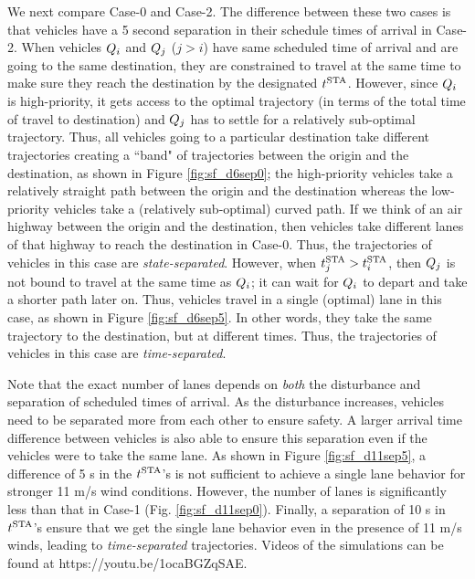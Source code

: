 We next compare Case-0 and Case-2. The difference between these two cases is that vehicles have a 5 second separation in their schedule times of arrival in Case-2. When vehicles $Q_i$ and $Q_{j}$ ($j>i$) have same scheduled time of arrival and are going to the same destination, they are constrained to travel at the same time to make sure they reach the destination by the designated $t^\text{STA}$. However, since $Q_i$ is high-priority, it gets access to the optimal trajectory (in terms of the total time of travel to destination) and $Q_{j}$ has to settle for a relatively sub-optimal trajectory. Thus, all vehicles going to a particular destination take different trajectories creating a ``band" of trajectories between the origin and the destination, as shown in Figure \ref{fig:sf_d6sep0}; the high-priority vehicles take a relatively straight path between the origin and the destination whereas the low-priority vehicles take a (relatively sub-optimal) curved path. If we think of an air highway between the origin and the destination, then vehicles take different lanes of that highway to reach the destination in Case-0. Thus, the trajectories of vehicles in this case are \textit{state-separated}. However, when $t^\text{STA}_j > t^\text{STA}_i$, then $Q_j$ is not bound to travel at the same time as $Q_i$; it can wait for $Q_i$ to depart and take a shorter path later on. Thus, vehicles travel in a single (optimal) lane in this case, as shown in Figure \ref{fig:sf_d6sep5}. In other words, they take the same trajectory to the destination, but at different times. Thus, the trajectories of vehicles in this case are \textit{time-separated}. 

Note that the exact number of lanes depends on \textit{both} the disturbance and separation of scheduled times of arrival. As the disturbance increases, vehicles need to be separated more from each other to ensure safety. A larger arrival time difference between vehicles is also able to ensure this separation even if the vehicles were to take the same lane. As shown in Figure \ref{fig:sf_d11sep5}, a difference of 5 s in the $t^\text{STA}$'s is not sufficient to achieve a single lane behavior for stronger 11 m/s wind conditions. However, the number of lanes is significantly less than that in Case-1 (Fig. \ref{fig:sf_d11sep0}). Finally, a separation of 10 s in $t^\text{STA}$'s ensure that we get the single lane behavior even in the presence of 11 m/s winds, leading to \textit{time-separated} trajectories. Videos of the simulations can be found at https://youtu.be/1ocaBGZqSAE.

